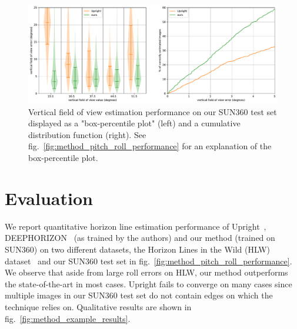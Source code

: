 \begin{figure}
\centering
\includegraphics[width=\linewidth]{figures/method/vfov_performance_sun360.pdf}
\caption[Field of view estimation performance]{Vertical field of view estimation performance on our SUN360 test set displayed as a "box-percentile plot" (left) and a cumulative distribution function (right). See fig.~\ref{fig:method_pitch_roll_performance} for an explanation of the box-percentile plot.
}
\label{fig:method_vfov_performance}
\vspace{-1em}
\end{figure}


\section{Evaluation}

We report quantitative horizon line estimation performance of Upright~\cite{Lee2014}, DEEPHORIZON~\cite{Workman2016} (as trained by the authors) and our method (trained on SUN360) on two different datasets, the Horizon Lines in the Wild (HLW) dataset~\cite{Workman2016} and our SUN360 test set in fig.~\ref{fig:method_pitch_roll_performance}. We observe that aside from large roll errors on HLW, our method outperforms the state-of-the-art in most cases. Upright fails to converge on many cases since multiple images in our SUN360 test set do not contain edges on which the technique relies on. Qualitative results are shown in fig.~\ref{fig:method_example_results}.

